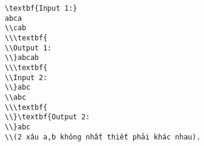 \begin{verbatim}
\textbf{Input 1:}
abca
\\cab
\\\textbf{
\\Output 1:
\\}abcab
\\\textbf{
\\Input 2:
\\}abc
\\abc
\\\textbf{
\\}\textbf{Output 2:
\\}abc
\\(2 xâu a,b không nhất thiết phải khác nhau).\end{verbatim}